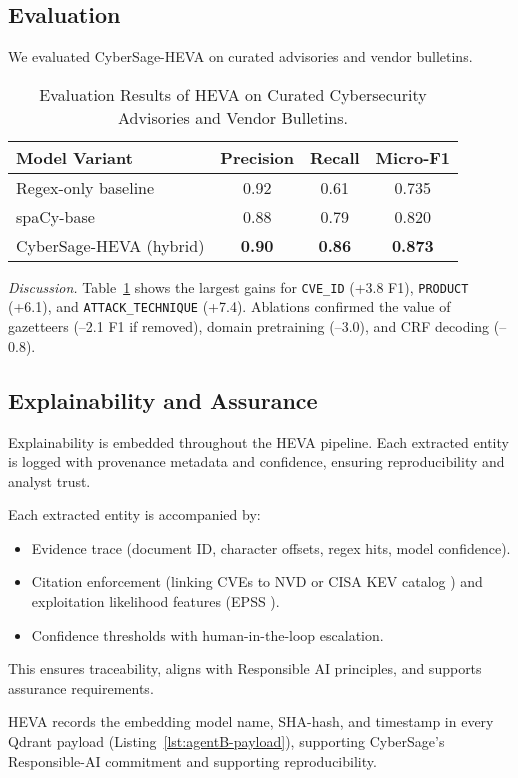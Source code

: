 \subsection{Evaluation}
We evaluated CyberSage-HEVA on curated advisories and vendor bulletins.

\smallskip
\begin{table}[htbp]
\centering
\caption{Evaluation Results of HEVA on Curated Cybersecurity Advisories and Vendor Bulletins.}
\label{tab:heva-eval}
\begin{tabular}{@{}lccc@{}}
\toprule
Model Variant & Precision & Recall & Micro-F1 \\ \midrule
Regex-only baseline & 0.92 & 0.61 & 0.735 \\
spaCy-base & 0.88 & 0.79 & 0.820 \\
CyberSage-HEVA (hybrid) & \textbf{0.90} & \textbf{0.86} & \textbf{0.873} \\
\bottomrule
\end{tabular}
\end{table}

\noindent
\textit{Discussion.} Table~\ref{tab:heva-eval} shows the largest gains for \texttt{CVE\_ID} (+3.8 F1), \texttt{PRODUCT} (+6.1), and \texttt{ATTACK\_TECHNIQUE} (+7.4). 
Ablations confirmed the value of gazetteers (--2.1 F1 if removed), domain pretraining (--3.0), and CRF decoding (--0.8).

\subsection{Explainability and Assurance}
Explainability is embedded throughout the HEVA pipeline.  
Each extracted entity is logged with provenance metadata and confidence, ensuring reproducibility and analyst trust.

Each extracted entity is accompanied by:
\begin{itemize}
    \item Evidence trace (document ID, character offsets, regex hits, model confidence).
    \item Citation enforcement (linking CVEs to NVD or CISA KEV catalog \cite{cisa2025kev}) and exploitation likelihood features (EPSS \cite{first2025epss}).
    \item Confidence thresholds with human-in-the-loop escalation.
\end{itemize}
This ensures traceability, aligns with Responsible AI principles, and supports assurance requirements.

HEVA records the embedding model name, SHA-hash, and timestamp in every Qdrant payload (Listing~\ref{lst:agentB-payload}), supporting CyberSage’s Responsible-AI commitment and supporting reproducibility.

